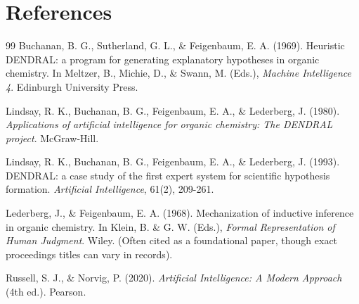 \documentclass[12pt,a4paper]{article}
\begin{document}
\section*{References}
\renewcommand{\refname}{\vspace{-1em}} %
\begin{thebibliography}{99}
    Buchanan, B. G., Sutherland, G. L., \& Feigenbaum, E. A. (1969). Heuristic DENDRAL: a program for generating explanatory hypotheses in organic chemistry. In Meltzer, B., Michie, D., \& Swann, M. (Eds.), \textit{Machine Intelligence 4}. Edinburgh University Press.
    
    Lindsay, R. K., Buchanan, B. G., Feigenbaum, E. A., \& Lederberg, J. (1980). \textit{Applications of artificial intelligence for organic chemistry: The DENDRAL project}. McGraw-Hill.
    
    Lindsay, R. K., Buchanan, B. G., Feigenbaum, E. A., \& Lederberg, J. (1993). DENDRAL: a case study of the first expert system for scientific hypothesis formation. \textit{Artificial Intelligence}, 61(2), 209-261.
    
    Lederberg, J., \& Feigenbaum, E. A. (1968). Mechanization of inductive inference in organic chemistry. In Klein, B. \& G. W. (Eds.), \textit{Formal Representation of Human Judgment}. Wiley. (Often cited as a foundational paper, though exact proceedings titles can vary in records).
    
    Russell, S. J., \& Norvig, P. (2020). \textit{Artificial Intelligence: A Modern Approach} (4th ed.). Pearson.
    

\end{thebibliography}
\end{document}
